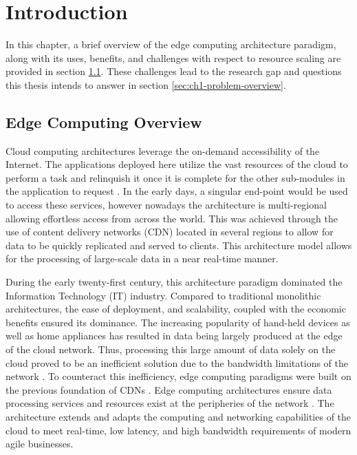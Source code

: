 \clearpage

\def\chaptertitle{Introduction}

\lhead{\emph{\chaptertitle}}

\chapter{\chaptertitle}
\label{ch:introduction}

In this chapter, a brief overview of the edge computing architecture paradigm, along with its uses, benefits, and challenges with respect to resource scaling are provided in section \ref{sec:ch1-edge-arch}. These challenges lead to the research gap and questions this thesis intends to answer in section \ref{sec:ch1-problem-overview}.\par

\section{Edge Computing Overview}
\label{sec:ch1-edge-arch}

Cloud computing architectures leverage the on-demand accessibility of the Internet. The applications deployed here utilize the vast resources of the cloud to perform a task and relinquish it once it is complete for the other sub-modules in the application to request \cite{rimal2009taxonomy}. In the early days, a singular end-point would be used to access these services, however nowadays the architecture is multi-regional allowing effortless access from across the world. This was achieved through the use of content delivery networks (CDN) located in several regions to allow for data to be quickly replicated and served to clients. This architecture model allows for the processing of large-scale data in a near real-time manner.\par

During the early twenty-first century, this architecture paradigm dominated the Information Technology (IT) industry. Compared to traditional monolithic architectures, the ease of deployment, and scalability, coupled with the economic benefits ensured its dominance. The increasing popularity of hand-held devices as well as home appliances has resulted in data being largely produced at the edge of the cloud network. Thus, processing this large amount of data solely on the cloud proved to be an inefficient solution due to the bandwidth limitations of the network \cite{shi2016edge}. To counteract this inefficiency, edge computing paradigms were built on the previous foundation of CDNs \cite{satyanarayanan2017emergence}. Edge computing architectures ensure data processing services and resources exist at the peripheries of the network \cite{cao2020overview}. The architecture extends and adapts the computing and networking capabilities of the cloud to meet real-time, low latency, and high bandwidth requirements of modern agile businesses.\par

